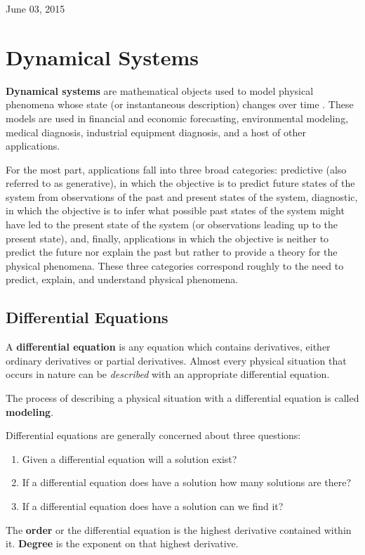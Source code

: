 \documentclass[journal]{IEEEtran}
\begin{document}
 
\hfill June 03, 2015

\section{Dynamical Systems}
\textbf{Dynamical systems} are mathematical objects used to model physical phenomena whose state (or instantaneous description) changes over time \cite{katok1997introduction}. These models are used in financial and economic forecasting, environmental modeling, medical diagnosis, industrial equipment diagnosis, and a host of other applications.

For the most part, applications fall into three broad categories: predictive (also referred to as generative), in which the objective is to predict future states of the system from observations of the past and present states of the system, diagnostic, in which the objective is to infer what possible past states of the system might have led to the present state of the system (or observations leading up to the present state), and, finally, applications in which the objective is neither to predict the future nor explain the past but rather to provide a theory for the physical phenomena. These three categories correspond roughly to the need to predict, explain, and understand physical phenomena.

\subsection{Differential Equations}
A \textbf{differential equation} is any equation which contains derivatives, either ordinary derivatives or partial derivatives. Almost every physical situation that occurs in nature can be \textit{described} with an appropriate differential equation. 

The process of describing a physical situation with a differential equation is called \textbf{modeling}.

Differential equations are generally concerned about three questions:
\begin{enumerate}
\item Given a differential equation will a solution exist? 
\item If a differential equation does have a solution how many solutions are there?
\item If a differential equation does have a solution can we find it?
\end{enumerate}

The \textbf{order} or the differential equation is the highest derivative contained within it. \textbf{Degree} is the exponent on that highest derivative.
\end{document}
